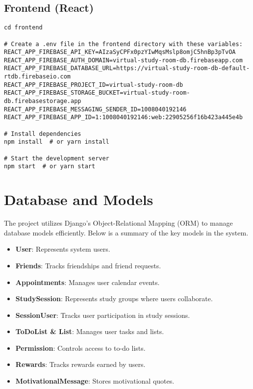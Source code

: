 \documentclass[a4paper,12pt]{article}
\begin{document}
\subsection{Frontend (React)}
\begin{verbatim}
cd frontend

# Create a .env file in the frontend directory with these variables:
REACT_APP_FIREBASE_API_KEY=AIzaSyCPFx0pzYIwMqsMslp8omjC5hnBp3pTvOA
REACT_APP_FIREBASE_AUTH_DOMAIN=virtual-study-room-db.firebaseapp.com
REACT_APP_FIREBASE_DATABASE_URL=https://virtual-study-room-db-default-rtdb.firebaseio.com
REACT_APP_FIREBASE_PROJECT_ID=virtual-study-room-db
REACT_APP_FIREBASE_STORAGE_BUCKET=virtual-study-room-db.firebasestorage.app
REACT_APP_FIREBASE_MESSAGING_SENDER_ID=1008040192146
REACT_APP_FIREBASE_APP_ID=1:1008040192146:web:22905256f16b423a445e4b

# Install dependencies
npm install  # or yarn install

# Start the development server
npm start  # or yarn start
\end{verbatim}

\section{Database and Models}

The project utilizes Django's Object-Relational Mapping (ORM) to manage database models efficiently. Below is a summary of the key models in the system.

\begin{itemize}
    \item \textbf{User}: Represents system users.
    \item \textbf{Friends}: Tracks friendships and friend requests.
    \item \textbf{Appointments}: Manages user calendar events.
    \item \textbf{StudySession}: Represents study groups where users collaborate.
    \item \textbf{SessionUser}: Tracks user participation in study sessions.
    \item \textbf{ToDoList \& List}: Manages user tasks and lists.
    \item \textbf{Permission}: Controls access to to-do lists.
    \item \textbf{Rewards}: Tracks rewards earned by users.
    \item \textbf{MotivationalMessage}: Stores motivational quotes.
\end{itemize}
\end{document}
